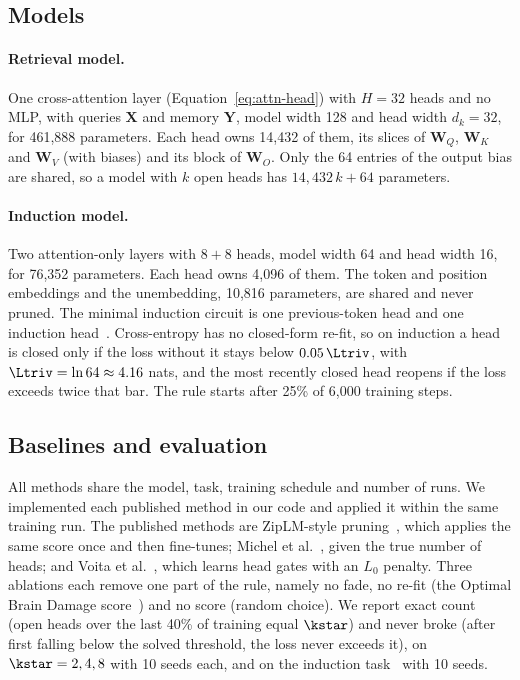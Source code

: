 \subsection{Models}

\paragraph{Retrieval model.} One cross-attention layer (Equation~\eqref{eq:attn-head}) with $H = 32$ heads and no MLP, with queries $\bm X$ and memory $\bm Y$, model width 128 and head width $d_k = 32$, for 461{,}888 parameters. Each head owns 14{,}432 of them, its slices of $\bm W_Q$, $\bm W_K$ and $\bm W_V$ (with biases) and its block of $\bm W_O$. Only the 64 entries of the output bias are shared, so a model with $k$ open heads has $14{,}432\,k + 64$ parameters.

\paragraph{Induction model.} Two attention-only layers with $8 + 8$ heads, model width 64 and head width 16, for 76{,}352 parameters. Each head owns 4{,}096 of them. The token and position embeddings and the unembedding, 10{,}816 parameters, are shared and never pruned. The minimal induction circuit is one previous-token head and one induction head~\citep{olsson2022}. Cross-entropy has no closed-form re-fit, so on induction a head is closed only if the loss without it stays below $0.05\,\Ltriv$, with $\Ltriv = \ln 64 \approx 4.16$ nats, and the most recently closed head reopens if the loss exceeds twice that bar. The rule starts after 25\% of 6{,}000 training steps.

\subsection{Baselines and evaluation}

All methods share the model, task, training schedule and number of runs. We implemented each published method in our code and applied it within the same training run. The published methods are ZipLM-style pruning~\cite{ziplm}, which applies the same score once and then fine-tunes; Michel et al.~\cite{michel2019sixteen}, given the true number of heads; and Voita et al.~\cite{voita2019analyzing}, which learns head gates with an $L_0$ penalty. Three ablations each remove one part of the rule, namely no fade, no re-fit (the Optimal Brain Damage score~\citep{obd}) and no score (random choice). We report exact count (open heads over the last 40\% of training equal $\kstar$) and never broke (after first falling below the solved threshold, the loss never exceeds it), on $\kstar = 2, 4, 8$ with 10 seeds each, and on the induction task~\citep{olsson2022} with 10 seeds.

